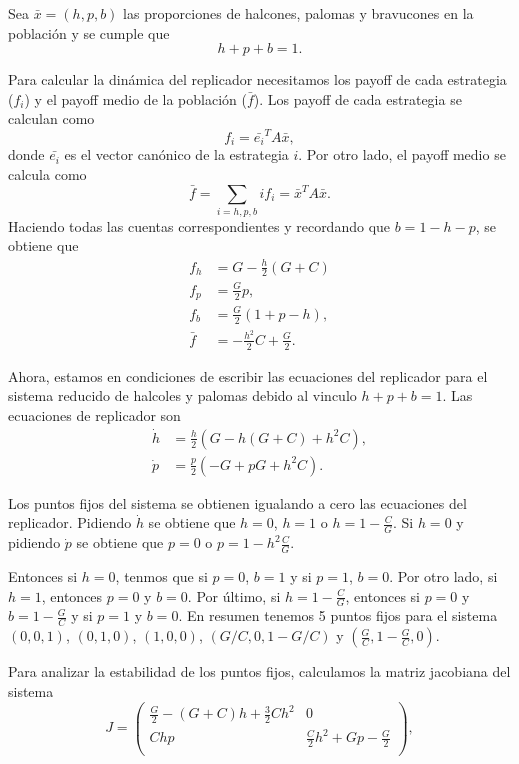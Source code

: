 \documentclass[letterpaper,12pt]{article}
\theoremstyle{plain}
\begin{document}
Sea $\bar{x} = (h,p,b)$ las proporciones de halcones, palomas y bravucones en la población y se cumple que 
\begin{equation}
    h + p + b = 1.
\end{equation}

Para calcular la dinámica del replicador necesitamos los payoff de cada estrategia ($f_i$) y el payoff medio de la población ($\bar{f}$). Los payoff de cada estrategia se calculan como
\begin{equation}
    f_i = \bar{e_i}^T  A  \bar{x},
\end{equation}
donde $\bar{e_i}$ es el vector canónico de la estrategia $i$. Por otro lado, el payoff medio se calcula como 
\begin{equation}
    \bar{f} = \sum_{i=h,p,b} i f_i = \bar{x}^T A \bar{x}.
\end{equation}
Haciendo todas las cuentas correspondientes y recordando que $b = 1 - h - p$, se obtiene que
\begin{align}
    f_h &= G - \frac{h}{2}(G+C) \\
    f_p &= \frac{G}{2} p, \\
    f_b &= \frac{G}{2} (1+p-h), \\
    \bar{f} &= -\frac{h^2}{2} C + \frac{G}{2}.
\end{align}

Ahora, estamos en condiciones de escribir las ecuaciones del replicador para el sistema reducido de halcoles y palomas debido al vinculo $h + p + b = 1$. Las ecuaciones de replicador son  
\begin{align}
    \dot{h} &= \frac{h}{2}(G - h(G+C) + h^2 C), \\
    \dot{p} &= \frac{p}{2}(-G + pG + h^2 C).
\end{align}

Los puntos fijos del sistema se obtienen igualando a cero las ecuaciones del replicador. Pidiendo $\dot{h}$ se obtiene que $h = 0$, $h=1$ o $h = 1 - \frac{C}{G}$. Si $h = 0$ y pidiendo $\dot{p}$ se obtiene que $p = 0$ o $p = 1- h^2\frac{C}{G}$.  

Entonces si $h=0$, tenmos que si $p = 0$, $b=1$ y si $p = 1$, $b = 0$. Por otro lado, si $h = 1$, entonces $p = 0$ y $b = 0$. Por último, si $h = 1 - \frac{C}{G}$, entonces si $p = 0$ y $b = 1 - \frac{G}{C}$ y si $p = 1$ y $b = 0$. En resumen tenemos 5 puntos fijos para el sistema $(0,0,1)$, $(0,1,0)$, $(1,0,0)$, $(G/C,0,1- G/C)$ y $(\frac{G}{C}, 1 - \frac{G}{C}, 0)$.

Para analizar la estabilidad de los puntos fijos, calculamos la matriz jacobiana del sistema 
\begin{equation}
    J =
\begin{pmatrix}
\frac{G}{2} - \left(G+C\right) h + \frac{3}{2}Ch^2  & 0 \\
Chp                                                 &  \frac{C}{2}h^2 + Gp - \frac{G}{2} \\
\end{pmatrix},
\end{equation}
\end{document}
